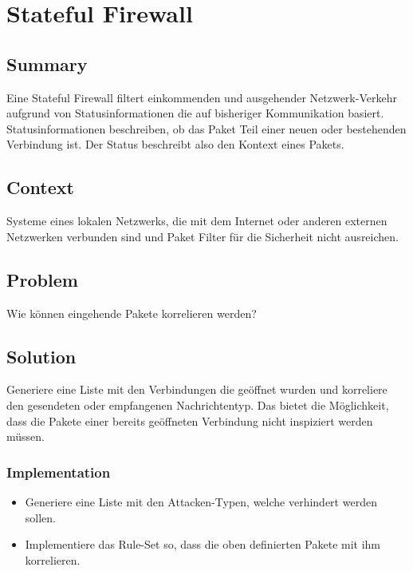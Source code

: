 \chapter{Stateful Firewall}

\section{Summary}
Eine Stateful Firewall filtert einkommenden und ausgehender Netzwerk-Verkehr aufgrund von Statusinformationen die auf bisheriger Kommunikation basiert. Statusinformationen beschreiben, ob das Paket Teil einer neuen oder bestehenden Verbindung ist. Der Status beschreibt also den Kontext eines Pakets.

\section{Context}
Systeme eines lokalen Netzwerks, die mit dem Internet oder anderen externen Netzwerken verbunden sind und Paket Filter für die Sicherheit nicht ausreichen.

\section{Problem}
Wie können eingehende Pakete korrelieren werden?

\section{Solution}
Generiere eine Liste mit den Verbindungen die geöffnet wurden und korreliere den gesendeten oder empfangenen Nachrichtentyp. Das bietet die Möglichkeit, dass die Pakete einer bereits geöffneten Verbindung nicht inspiziert werden müssen.

\subsection{Implementation}
\begin{itemize}
  \item Generiere eine Liste mit den Attacken-Typen, welche verhindert werden sollen.
  \item Implementiere das Rule-Set so, dass die oben definierten Pakete mit ihm korrelieren.
\end{itemize}

